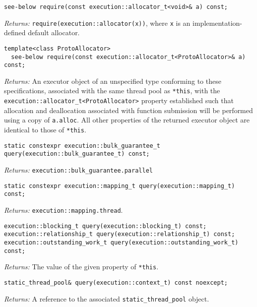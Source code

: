 \documentclass[a4paper,12pt,notitlepage,twoside,openright]{article}
\begin{document}
\begin{verbatim}
see-below require(const execution::allocator_t<void>& a) const;
\end{verbatim}

\emph{Returns:} \texttt{require(execution::allocator(x))},
where \texttt{x} is an implementation-defined default
allocator.

\begin{verbatim}
template<class ProtoAllocator>
  see-below require(const execution::allocator_t<ProtoAllocator>& a) const;
\end{verbatim}

\emph{Returns:} An executor object of an unspecified type conforming to
these specifications, associated with the same thread pool as
\texttt{*this}, with the
\texttt{execution::allocator_t<ProtoAllocator>} property
established such that allocation and deallocation associated with
function submission will be performed using a copy of
\texttt{a.alloc}. All other properties of the returned
executor object are identical to those of \texttt{*this}.

\begin{verbatim}
static constexpr execution::bulk_guarantee_t query(execution::bulk_guarantee_t) const;
\end{verbatim}

\emph{Returns:} \texttt{execution::bulk_guarantee.parallel}

\begin{verbatim}
static constexpr execution::mapping_t query(execution::mapping_t) const;
\end{verbatim}

\emph{Returns:} \texttt{execution::mapping.thread}.

\begin{verbatim}
execution::blocking_t query(execution::blocking_t) const;
execution::relationship_t query(execution::relationship_t) const;
execution::outstanding_work_t query(execution::outstanding_work_t) const;
\end{verbatim}

\emph{Returns:} The value of the given property of
\texttt{*this}.

\begin{verbatim}
static_thread_pool& query(execution::context_t) const noexcept;
\end{verbatim}

\emph{Returns:} A reference to the associated
\texttt{static_thread_pool} object.
\end{document}
